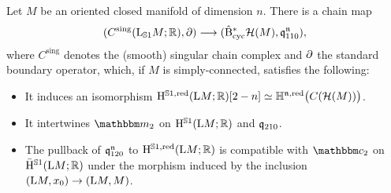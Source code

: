 \documentclass[\MainFolder/Text.tex]{subfiles}
\begin{document}
%
%

\begin{Conjecture}\label{Conj:StringTopology}
Let $M$ be an oriented closed manifold of dimension $n$. There is a chain map 
$$(C^{\mathrm{sing}}(\mathrm{L}_{\mathbb{S}{1}}M; \mathbb{R}),\partial)\longrightarrow (\hat{\mathrm{B}}_{\mathrm{cyc}}^*\mathcal{H}(M),\mathfrak{q}_{110}^{\mathfrak{n}}), $$
where $C^{\mathrm{sing}}$ denotes the (smooth) singular chain complex and $\partial$ the standard boundary operator, which, if $M$ is simply-connected, satisfies the following:
\begin{itemize}
\item It induces an isomorphism $\mathrm{H}^{\mathbb{S}{1}, \mathrm{red}}(\mathrm{L} M; \mathbb{R})[2-n] \simeq \mathbb{H}^{\mathfrak{n},\mathrm{red}}\bigl(C(\mathcal{H}(M))\bigr)$.
\item It intertwines $\StringOp_2$ on $\mathrm{H}^{\mathbb{S}{1}}(\mathrm{L} M; \mathbb{R})$ and $\mathfrak{q}_{210}$.
\item The pullback of $\mathfrak{q}_{120}^{\mathfrak{n}}$ to $\mathrm{H}^{\mathbb{S}{1}, \mathrm{red}}(\mathrm{L} M; \mathbb{R})$ is compatible with $\StringCoOp_2$ on $\bar{\mathrm{H}}^{\mathbb{S}{1}}(\mathrm{L} M; \mathbb{R})$ under the morphism induced by the inclusion $(\mathrm{L} M, x_0) \rightarrow (\mathrm{L} M,M)$.
\end{itemize}
\end{Conjecture}
\end{document}
